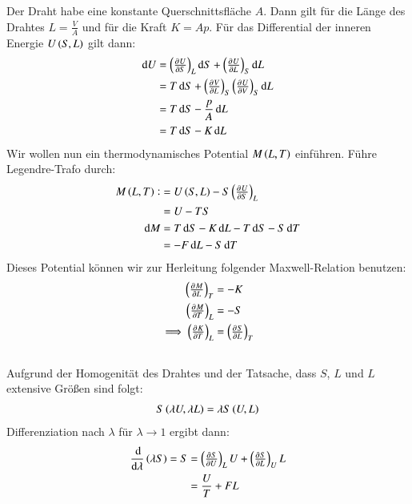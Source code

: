 \subsection{}
Der Draht habe eine konstante Querschnittsfläche $A$. Dann gilt für die Länge des Drahtes $L=\frac VA$ und für die Kraft $K=Ap$. Für das Differential der inneren Energie $U\del {S,L}$ gilt dann:
\begin{align*}
\dif U &= \del{\pd US}_L \dif S + \del{\pd UL}_S \dif L \\
&= T \dif S + \del{\pd VL}_S \del{\pd UV}_S \dif L \\
&= T \dif S - \frac{p}{A} \dif L \\
&= T \dif S - K \dif L
\end{align*}
Wir wollen nun ein thermodynamisches Potential $M\del{L,T}$ einführen. Führe Legendre-Trafo durch:
\begin{align*}
M\del{L,T} :&= U\del{S,L}- S \del{\pd US}_L \\
&=U-TS \\
\dif M &= T \dif S - K \dif L - T \dif S - S \dif T \\
&=-F \dif L - S \dif T
\end{align*}
Dieses Potential können wir zur Herleitung folgender Maxwell-Relation benutzen:
\begin{align*}
\del{\pd ML}_T &= -K \\
\del{\pd MT}_L &= -S \\
\implies \del{\pd KT}_L &= \del{\pd SL}_T
\end{align*}


\subsection{}
Aufgrund der Homogenität des Drahtes und der Tatsache, dass $S$, $L$ und $L$ extensive Größen sind folgt:
\begin{align*}
S \del{\lambda U,\lambda L}=\lambda S\del{U,L} \\
\end{align*}
Differenziation nach $\lambda$ für $\lambda \longrightarrow 1$ ergibt dann:
\begin{align*}
\frac{\dif}{\dif \lambda} \del{\lambda S}= S &=\del{\pd SU}_L U + \del{\pd SL}_U L \\
&= \frac{U}{T}+ FL
\end{align*}


